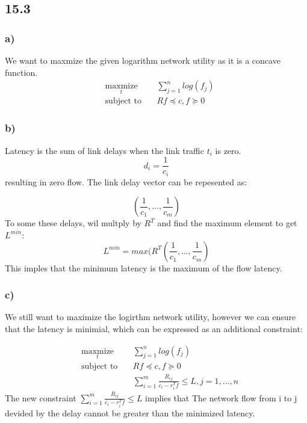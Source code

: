 \documentclass[12pt]{article}
\begin{document}
\subsection*{15.3}
\subsubsection*{a)}
We want to maxmize the given logarithm network utility as it is a concave function.
\begin{equation*}
\begin{aligned}
& \underset{t}{\text{maxmize}}
& & \sum_{j=1}^{n}log(f_j)\\
& \text{subject to}\
& &  Rf \preceq c, f \succeq 0
\end{aligned}
\end{equation*} 

\subsubsection*{b)}
Latency is the sum of link delays when the link traffic $t_i$ is zero. $$d_i = \frac{1}{c_i}$$ resulting in zero flow. The link delay vector can be repesented as:

$$(\frac{1}{c_1},\dots,\frac{1}{c_m})$$
To some these delays, wil multply by $R^T$ and find the maximum element to get $L^{min}$:
$$L^{min}=max(R^T(\frac{1}{c_1},\dots,\frac{1}{c_m})$$
This imples that the minimum latency is the maximum of the flow latency.

\subsubsection*{c)}
We still want to maximize the logirthm network utility, however we can ensure that the latency is minimial, which can be expressed as an additional constraint:

\begin{equation*}
\begin{aligned}
& \underset{t}{\text{maxmize}}
& & \sum_{j=1}^{n}log(f_j)\\
& \text{subject to}\
& & Rf \preceq c, f \succeq 0\\
&&& \sum_{i=1}^{m}\frac{R_{ij}}{c_i-r_i^Tf} \le L, j=1,\dots,n 
\end{aligned}
\end{equation*} 
The new constraint $\sum_{i=1}^{m}\frac{R_{ij}}{c_i-r_i^Tf} \le L$ implies that The network flow from i to j devided by the delay cannot be greater than the minimized latency.
\end{document}
